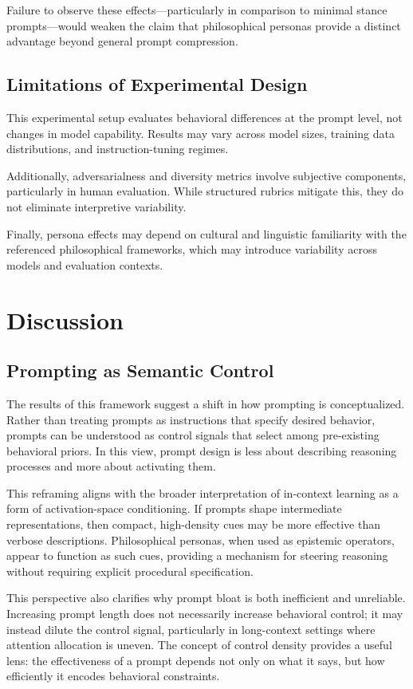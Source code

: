 \documentclass[11pt]{article}
\begin{document}
Failure to observe these effects—particularly in comparison to minimal stance prompts—would weaken the claim that philosophical personas provide a distinct advantage beyond general prompt compression.

\subsection{Limitations of Experimental Design}

This experimental setup evaluates behavioral differences at the prompt level, not changes in model capability. Results may vary across model sizes, training data distributions, and instruction-tuning regimes.

Additionally, adversarialness and diversity metrics involve subjective components, particularly in human evaluation. While structured rubrics mitigate this, they do not eliminate interpretive variability.

Finally, persona effects may depend on cultural and linguistic familiarity with the referenced philosophical frameworks, which may introduce variability across models and evaluation contexts.

\section{Discussion}

\subsection{Prompting as Semantic Control}

The results of this framework suggest a shift in how prompting is conceptualized. Rather than treating prompts as instructions that specify desired behavior, prompts can be understood as control signals that select among pre-existing behavioral priors. In this view, prompt design is less about describing reasoning processes and more about activating them.

This reframing aligns with the broader interpretation of in-context learning as a form of activation-space conditioning. If prompts shape intermediate representations, then compact, high-density cues may be more effective than verbose descriptions. Philosophical personas, when used as epistemic operators, appear to function as such cues, providing a mechanism for steering reasoning without requiring explicit procedural specification.

This perspective also clarifies why prompt bloat is both inefficient and unreliable. Increasing prompt length does not necessarily increase behavioral control; it may instead dilute the control signal, particularly in long-context settings where attention allocation is uneven. The concept of control density provides a useful lens: the effectiveness of a prompt depends not only on what it says, but how efficiently it encodes behavioral constraints.
\end{document}
